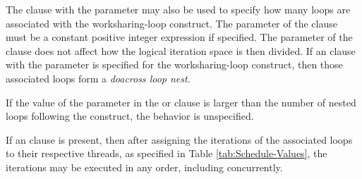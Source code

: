 The  clause with the parameter may also be used to specify
how many loops are associated with the worksharing-loop construct. The parameter of
the  clause must be a constant positive integer expression
if specified. The parameter of the  clause does not
affect how the logical iteration space is then divided. If an 
clause with the parameter is specified for the worksharing-loop construct, then those
associated loops form a \emph{doacross loop nest}.

If the value of the parameter in the  or 
clause is larger than the number of nested loops following the construct,
the behavior is unspecified.

If an  clause is present, then after assigning the
iterations of the associated loops to their respective threads, as specified in
Table \ref{tab:Schedule-Values}, the iterations may be executed in any order,
including concurrently.


\nolinenumbers

